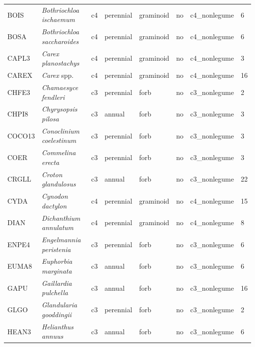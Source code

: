 \begin{landscape}
\begin{table}[]
{\begin{tabular}{p{2cm}p{5cm}p{2cm}p{2cm}p{2cm}p{2cm}p{3.5cm}p{2cm}}
            BOIS   & \textit{Bothriochloa ischaemum}    & c4 & perennial & graminoid      & no  & c4\_nonlegume & 6  \\
            BOSA   & \textit{Bothriochloa saccharoides} & c4 & perennial & graminoid      & no  & c4\_nonlegume & 6  \\
            CAPL3  & \textit{Carex planostachys}        & c4 & perennial & graminoid      & no  & c4\_nonlegume & 3  \\
            CAREX  & \textit{Carex} spp.                & c4 & perennial & graminoid      & no  & c4\_nonlegume & 16 \\
            CHFE3  & \textit{Chamaesyce fendleri}       & c3 & perennial & forb           & no  & c3\_nonlegume & 2  \\
            CHPI8  & \textit{Chyrysopsis pilosa}        & c3 & annual    & forb           & no  & c3\_nonlegume & 3  \\
            COCO13 & \textit{Conoclinium coelestinum}   & c3 & perennial & forb           & no  & c3\_nonlegume & 3  \\
            COER   & \textit{Commelina erecta}          & c3 & perennial & forb           & no  & c3\_nonlegume & 3  \\
            CRGLL  & \textit{Croton glandulosus}        & c3 & annual    & forb           & no  & c3\_nonlegume & 22 \\
            CYDA   & \textit{Cynodon dactylon}          & c4 & perennial & graminoid      & no  & c4\_nonlegume & 15 \\
            DIAN   & \textit{Dichanthium annulatum}     & c4 & perennial & graminoid      & no  & c4\_nonlegume & 8  \\
            ENPE4  & \textit{Engelmannia peristenia}    & c3 & perennial & forb           & no  & c3\_nonlegume & 6  \\
            EUMA8  & \textit{Euphorbia marginata}       & c3 & annual    & forb           & no  & c3\_nonlegume & 6  \\
            GAPU   & \textit{Gaillardia pulchella}      & c3 & annual    & forb           & no  & c3\_nonlegume & 16 \\
            GLGO   & \textit{Glandularia gooddingii}    & c3 & perennial & forb           & no  & c3\_nonlegume & 2  \\
            HEAN3  & \textit{Helianthus annuus}         & c3 & annual    & forb           & no  & c3\_nonlegume & 6  \\
            \hline
        \end{tabular}}
    \end{table}
\end{landscape}
\clearpage

